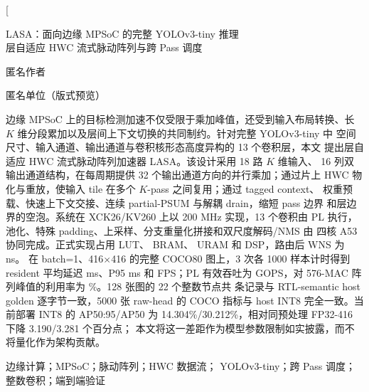 \documentclass[10.5pt,compsoc,UTF8]{CjC}
\newcommand{\LASA}{\textsc{LASA}}
\newcommand{\Kpass}{$K$-pass}
\begin{document}
\thispagestyle{empty}
\twocolumn[
\begin{minipage}{\textwidth}

\begin{center}
\vspace*{2mm}
{\heiti
LASA：面向边缘 MPSoC 的完整 YOLOv3-tiny 推理\\[1.5mm]
层自适应 HWC 流式脉动阵列与跨 Pass 调度\par}
\vskip 4mm
{\fangsong 匿名作者\par}
\vskip 1mm
{\songti 匿名单位（版式预览）\par}
\end{center}

\vskip 4mm
\setlength{\baselineskip}{16pt}\selectfont
{}
边缘 MPSoC 上的目标检测加速不仅受限于乘加峰值，还受到输入布局转换、长
$K$ 维分段累加以及层间上下文切换的共同制约。针对完整 YOLOv3-tiny 中
空间尺寸、输入通道、输出通道与卷积核形态高度异构的 13 个卷积层，本文
提出层自适应 HWC 流式脉动阵列加速器 \LASA。该设计采用 18 路 $K$ 维输入、
16 列双输出通道结构，在每周期提供 32 个输出通道方向的并行乘加；通过片上
HWC 物化与重放，使输入 tile 在多个 \Kpass{} 之间复用；通过 tagged context、
权重预载、快速上下文交接、连续 partial-PSUM 与解耦 drain，缩短 pass 边界
和层边界的空泡。系统在 XCK26/KV260 上以 200 MHz 实现，13 个卷积由 PL
执行，池化、特殊 padding、上采样、分支重量化拼接和双尺度解码/NMS 由
四核 A53 协同完成。正式实现占用 \LUTCount{} LUT、\BRAMCount{} BRAM、
\URAMCount{} URAM 和 \DSPCount{} DSP，路由后 WNS 为 \WNSValue{} ns。
在 batch=1、416$\times$416 的完整 COCO80 图上，3 次各 1000 样本计时得到
resident 平均延迟 \ResidentMeanMs{} ms、P95 \ResidentPNinetyFiveMs{} ms 和
\ResidentFPS{} FPS；PL 有效吞吐为 \PLEffectiveGOPS{} GOPS，对 576-MAC
阵列峰值的利用率为 \ArrayUtilization{}\%。128 张图的 22 个整数节点共
\NodeRecords{} 条记录与 RTL-semantic host golden 逐字节一致，5000 张
raw-head 的 COCO 指标与 host INT8 完全一致。当前部署 INT8 的 AP50:95/AP50
为 14.304\%/30.212\%，相对同预处理 FP32-416 下降 3.190/3.281 个百分点；
本文将这一差距作为模型参数限制如实披露，而不将量化作为架构贡献。\par

\vspace{2mm}
边缘计算；MPSoC；脉动阵列；HWC 数据流；
YOLOv3-tiny；跨 Pass 调度；整数卷积；端到端验证\par


\end{minipage}
\end{document}

